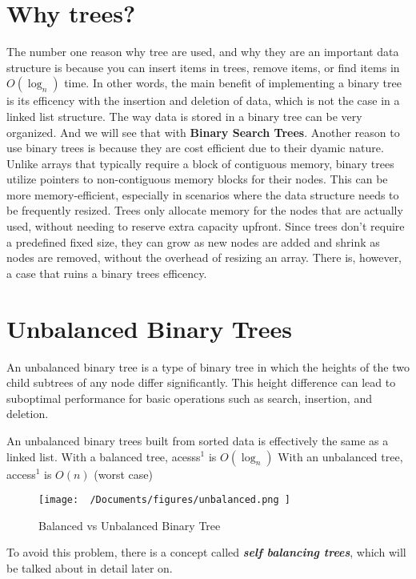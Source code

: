 \documentclass{report}
\begin{document}
\section{Why trees?}
The number one reason why tree are used, and why they are an important data structure is because you can insert items in trees, remove items, or find items in $O(\log_n)$ time. In other words, the main benefit of implementing a binary tree is its efficency with the insertion and deletion of data, which is not the case in a linked list structure.
\bigbreak \noindent
The way data is stored in a binary tree can be very organized. And we will see that with \textbf{Binary Search Trees}.
\bigbreak \noindent
Another reason to use binary trees is because they are cost efficient due to their dyamic nature.
\bigbreak \noindent
Unlike arrays that typically require a block of contiguous memory, binary trees utilize pointers to non-contiguous memory blocks for their nodes. This can be more memory-efficient, especially in scenarios where the data structure needs to be frequently resized. Trees only allocate memory for the nodes that are actually used, without needing to reserve extra capacity upfront.
\bigbreak \noindent
Since trees don't require a predefined fixed size, they can grow as new nodes are added and shrink as nodes are removed, without the overhead of resizing an array. There is, however, a case that ruins a binary trees efficency.
\section{Unbalanced Binary Trees}
An unbalanced binary tree is a type of binary tree in which the heights of the two child subtrees of any node differ significantly. This height difference can lead to suboptimal performance for basic operations such as search, insertion, and deletion. \vspace{2mm}

\noindent An unbalanced binary trees built from sorted data is effectively the same as a linked list.
\bigbreak \noindent
With a balanced tree, acesss$^1$ is $O(\log_n)$
\bigbreak \noindent
With an unbalanced tree, access$^1$ is $O(n)$ (worst case)
\begin{figure}[ht]
\centering
\texttt{[image:  ~/Documents/figures/unbalanced.png ]}
\caption{Balanced vs Unbalanced Binary Tree}
\end{figure}
\bigbreak \noindent
To avoid this problem, there is a concept called \textit{\textbf{self balancing trees}}, which will be talked about in detail later on.
\end{document}
